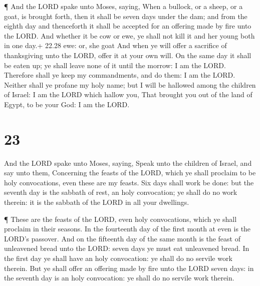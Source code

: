  ¶ And the LORD spake unto Moses, saying, 
When a bullock, or a sheep, or a goat, is brought forth, then it shall
be seven days under the dam; and from the eighth day and thenceforth it
shall be accepted for an offering made by fire unto the LORD.
 And whether it be cow or ewe, ye shall not kill it and her
young both in one day.+ 22.28 ewe: or, she goat  And when
ye will offer a sacrifice of thanksgiving unto the LORD, offer it at
your own will.  On the same day it shall be eaten up; ye
shall leave none of it until the morrow: I am the LORD. 
Therefore shall ye keep my commandments, and do them: I am the LORD.
 Neither shall ye profane my holy name; but I will be
hallowed among the children of Israel: I am the LORD which hallow you,
 That brought you out of the land of Egypt, to be your God:
I am the LORD.

\hypertarget{section-22}{%
\section{23}\label{section-22}}

 And the LORD spake unto Moses, saying,  Speak
unto the children of Israel, and say unto them, Concerning the feasts of
the LORD, which ye shall proclaim to be holy convocations, even these
are my feasts.  Six days shall work be done: but the seventh
day is the sabbath of rest, an holy convocation; ye shall do no work
therein: it is the sabbath of the LORD in all your dwellings.

 ¶ These are the feasts of the LORD, even holy convocations,
which ye shall proclaim in their seasons.  In the fourteenth
day of the first month at even is the LORD's passover.  And
on the fifteenth day of the same month is the feast of unleavened bread
unto the LORD: seven days ye must eat unleavened bread.  In
the first day ye shall have an holy convocation: ye shall do no servile
work therein.  But ye shall offer an offering made by fire
unto the LORD seven days: in the seventh day is an holy convocation: ye
shall do no servile work therein.

